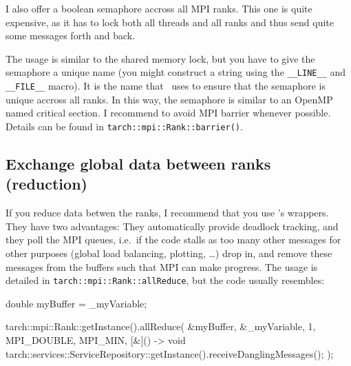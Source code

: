 I also offer a boolean semaphore accross all MPI ranks. This one is quite
expensive, as it has to lock both all threads and all ranks and thus send
quite some messages forth and back. 

The usage is similar to the shared memory lock, but you have to give the
semaphore a unique name (you might construct a string using the
\texttt{\_\_LINE\_\_} and \texttt{\_\_FILE\_\_} macro). 
It is the name that \Peano\ uses to ensure that the semaphore is unique accross
all ranks.
In this way, the semaphore is similar to an OpenMP named critical section.
I recommend to avoid MPI barrier whenever possible.
Details can be found in \texttt{tarch::mpi::Rank::barrier()}.



\subsection{Exchange global data between ranks (reduction)}
\label{section:parallel-programming:shared-mem:reductions}

If you reduce data betwen the ranks, I recommend that you use \Peano's wrappers.
They have two advantages: 
They automatically provide deadlock tracking, and they poll the MPI queues,
i.e.~if the code stalls as too many other messages for other purposes (global
load balancing, plotting, \ldots) drop in, and remove these messages from the
buffers such that MPI can make progress. The usage is detailed in
\texttt{tarch::mpi::Rank::allReduce}, but the code usually resembles:

\begin{code}
double myBuffer = _myVariable;

tarch::mpi::Rank::getInstance().allReduce(
  &myBuffer,
  &_myVariable,
  1, MPI_DOUBLE,
  MPI_MIN,
  [&]() -> void { tarch::services::ServiceRepository::getInstance().receiveDanglingMessages(); }
);
\end{code}
      